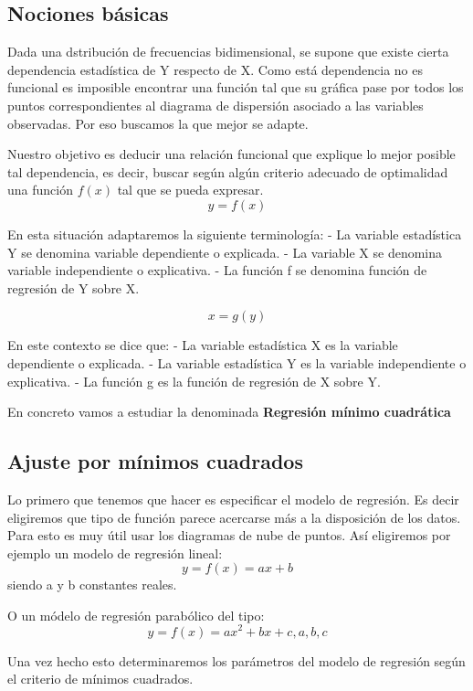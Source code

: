 \documentclass{article}
\begin{document}
	 \subsection{Nociones básicas}
	 
	 Dada una dstribución de frecuencias bidimensional, se supone que existe cierta dependencia estadística de Y respecto de X.
	 Como está dependencia no es funcional es imposible encontrar una función tal que su gráfica pase por todos los puntos correspondientes al diagrama de dispersión asociado a las variables observadas. Por eso buscamos la que mejor se adapte.
	 
	  Nuestro objetivo es deducir una relación funcional que explique lo mejor posible tal dependencia, es decir, buscar según algún criterio adecuado de optimalidad una función $f(x)$ tal que se pueda expresar.
	 $$ y = f(x) $$
	 
	En esta situación adaptaremos la siguiente terminología:
		- La variable estadística Y se denomina variable dependiente o explicada.
		- La variable X se denomina variable independiente o explicativa.
		- La función f se denomina función de regresión de Y sobre X.
		
	$$ x = g(y) $$
	
	En este contexto se dice que:
		- La variable estadística X es la variable dependiente o explicada.
		- La variable estadística Y es la variable independiente o explicativa.
		- La función g es la función de regresión de X sobre Y.
		
	En concreto vamos a estudiar la denominada \textbf{Regresión mínimo cuadrática} 
	
	\subsection{Ajuste por mínimos cuadrados}
	
	Lo primero que tenemos que hacer es especificar el modelo de regresión. Es decir eligiremos que tipo de función parece acercarse más a la disposición de los datos. Para esto es muy útil usar los diagramas de nube de puntos. Así eligiremos por ejemplo un modelo de regresión lineal: $$ y = f(x) = ax + b $$ siendo a y b constantes reales.
	
	O un módelo de regresión parabólico del tipo:
	$$ y = f(x) = ax^2 +bx + c, a,b,c $$
	
	Una vez hecho esto determinaremos los parámetros del modelo de regresión según el criterio de mínimos cuadrados.
	\vspace{2mm}
	
\end{document}
